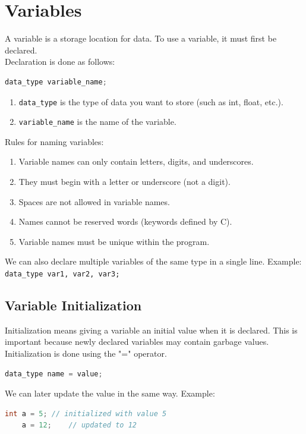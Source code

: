 \section{Variables}

A variable is a storage location for data.  
To use a variable, it must first be declared.  
\\ Declaration is done as follows:
\begin{lstlisting}[language=c]
	data_type variable_name;
\end{lstlisting}
\begin{enumerate}[label={}, leftmargin=*]
	\item \verb|data_type| is the type of data you want to store (such as int, float, etc.).
	\item \verb|variable_name| is the name of the variable.
\end{enumerate}

Rules for naming variables:
\begin{enumerate}
	\item Variable names can only contain letters, digits, and underscores.
	\item They must begin with a letter or underscore (not a digit).
	\item Spaces are not allowed in variable names.
	\item Names cannot be reserved words (keywords defined by C).
	\item Variable names must be unique within the program.
\end{enumerate}
We can also declare multiple variables of the same type in a single line.  
Example: \verb|data_type var1, var2, var3;|

\subsection*{Variable Initialization}

Initialization means giving a variable an initial value when it is declared.  
This is important because newly declared variables may contain garbage values.  
Initialization is done using the "=" operator.
{
\captionsetup[lstlisting]{labelformat=empty, justification=raggedright, singlelinecheck=false}
\begin{lstlisting}[language=c, caption={syntax}]
	data_type name = value;
\end{lstlisting}
}
We can later update the value in the same way.  
Example:
\begin{lstlisting}[language=c]
	int a = 5; // initialized with value 5
	a = 12;    // updated to 12
\end{lstlisting}

